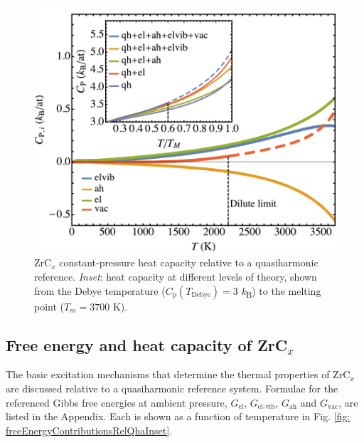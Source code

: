 \documentclass[twocolumn,american,aps,prb,showpacs,showkeys,amsmath,amssymb,superscriptaddress,a4]{revtex4-1}
\begin{document}
\begin{figure}[h]
\begin{centering}
\includegraphics[scale=0.55]{Fig9_pltCpRelative}
\par\end{centering}
\caption{\foreignlanguage{american}{ZrC\protect$_x$ constant-pressure heat capacity relative
to a quasiharmonic reference. \emph{Inset}: heat capacity at different
levels of theory, shown from the Debye temperature ($C_{\text{p}}(T_{\text{Debye}})=3$
\emph{k}\protect\textsubscript{B}) to the melting point ($T_{m}=3700$
K). \label{fig: pltCpRelative}}}
\end{figure}

\subsection{Free energy and heat capacity of ZrC\protect$_x$\label{subsec: testApplicationZrCx-heatCapacity}}

The basic excitation mechanisms that determine the thermal properties of ZrC$_x$  are discussed relative to a quasiharmonic reference system.  Formulae for the referenced Gibbs free energies at ambient pressure, $G_{\text{el}}$, $G_{\text{el-vib}}$, $G_{\text{ah}}$ and 
$G_{\text{vac}}$, are listed in the Appendix.
Each is shown as a function of temperature in Fig. \ref{fig: freeEnergyContributionsRelQhaInset}.
\end{document}
